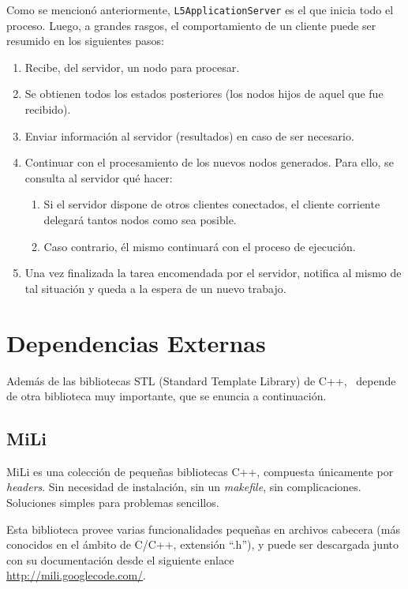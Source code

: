 			Como se mencion\'o anteriormente, \texttt{L5ApplicationServer} es el que inicia todo el proceso. Luego, a grandes rasgos, el comportamiento de
      un cliente puede ser resumido en los siguientes pasos:
      \begin{enumerate}
        \item Recibe, del servidor, un nodo para procesar.
        \item Se obtienen todos los estados posteriores (los nodos hijos de aquel que fue recibido).
        \item Enviar informaci\'on al servidor (resultados) en caso de ser necesario.
        \item Continuar con el procesamiento de los nuevos nodos generados. Para ello, se consulta al servidor qu\'e hacer:
          \begin{enumerate}
            \item Si el servidor dispone de otros clientes conectados, el cliente corriente delegar\'a tantos nodos como sea posible.
            \item Caso contrario, \'el mismo continuar\'a con el proceso de ejecuci\'on.
          \end{enumerate}
        \item Una vez finalizada la tarea encomendada por el servidor, notifica al mismo de tal situaci\'on y queda a la espera de un nuevo trabajo.
      \end{enumerate}

\newpage
    \section{Dependencias Externas}
		Adem\'as de las bibliotecas STL (Standard Template Library) de C++, \combeng \ depende de otra biblioteca muy importante, que se enuncia a continuaci\'on.
		
		\subsection{MiLi}\label{mili}
		MiLi es una colecci\'on de peque\~nas bibliotecas C++, compuesta \'unicamente por \textit{headers}. Sin necesidad de instalaci\'on, sin un \textit
    {makefile}, sin complicaciones. Soluciones simples para problemas sencillos.
		
		Esta biblioteca provee varias funcionalidades peque\~nas en archivos cabecera (m\'as conocidos en el \'ambito de C/C++, extensi\'on ``.h''), 
    y puede ser descargada junto con su documentaci\'on desde el siguiente enlace\\ \url{http://mili.googlecode.com/}.
		
